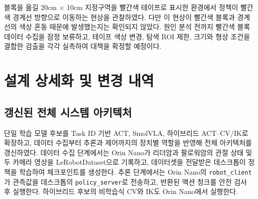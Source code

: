 \documentclass[titlepage]{pnureport}
\begin{document}
블록을 옮길 20cm $\times$ 10cm 지정구역을 빨간색 테이프로 표시한 환경에서 정책이 빨간색 경계선 방향으로 이동하는 현상을 관찰하였다. 다만 이 현상이 빨간색 블록과 경계선의 색상 혼동 때문에 발생했는지는 확인되지 않았다. 원인 분석 전까지 빨간색 블록 데이터 수집을 잠정 보류하고, 테이프 색상 변경, 탐색 ROI 제한, 크기와 형상 조건을 결합한 검출을 각각 실측하여 대책을 확정할 예정이다.

\chapter{설계 상세화 및 변경 내역}

\section{갱신된 전체 시스템 아키텍처}

단일 학습 모델 후보를 Task ID 기반 ACT, SmolVLA, 하이브리드 ACT--CV/IK로 확장하고, 데이터 수집부터 추론과 제어까지의 장치별 역할을 반영해 전체 아키텍처를 갱신하였다. 데이터 수집 단계에서는 Orin Nano가 리더암과 팔로워암의 관절 상태 및 두 카메라 영상을 LeRobotDataset으로 기록하고, 데이터셋을 전달받은 데스크톱이 정책을 학습하여 체크포인트를 생성한다. 추론 단계에서는 Orin Nano의 \texttt{robot\_client}가 관측값을 데스크톱의 \texttt{policy\_server}로 전송하고, 반환된 액션 청크를 안전 검사 후 실행한다\cite{lerobot-async,grpc}. 하이브리드 후보의 비학습식 CV와 IK도 Orin Nano에서 실행한다.
\end{document}
